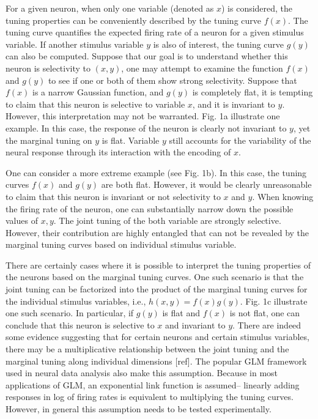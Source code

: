 \documentclass[11pt]{article}
\begin{document}
For a given neuron, when only one variable (denoted as $x$) is considered, the tuning properties can be conveniently described by the tuning curve $f(x)$. The tuning curve quantifies the expected firing rate of a neuron for a given stimulus variable.
If another stimulus variable $y$ is also of interest, the tuning curve $g(y)$ can also be computed. Suppose that our goal is to understand whether this neuron is selectivity to $(x,y)$, one may attempt to examine the function $f(x)$ and $g(y)$ to see if one or both of them show strong selectivity. Suppose that $f(x)$ is a narrow Gaussian function, and $g(y)$ is completely flat, it is tempting to claim that this neuron is selective to variable $x$, and it is invariant to $y$. However, this interpretation may not be warranted. Fig. 1a illustrate one example. In this case, the response of the neuron is clearly not invariant to $y$, yet the marginal tuning on $y$ is flat. Variable $y$ still accounts for the variability of the neural response through its interaction with the encoding of $x$.

One can consider a more extreme example (see Fig. 1b). In this case, the tuning curves $f(x)$ and $g(y)$ are both flat. However, it would be clearly unreasonable to claim that this neuron is invariant or not selectivity to $x$ and $y$. When knowing the firing rate of the neuron, one can substantially narrow down the possible  values of $x, y$. The joint tuning of the both variable are strongly selective. However, their contribution are highly entangled that can not be revealed by the marginal tuning curves based on individual stimulus variable. 

There are certainly cases where it is possible to interpret the tuning properties of the neurons based on the marginal tuning curves. One such scenario is that the joint tuning can be factorized into the product of the marginal tuning curves for the individual stimulus variables, i.e., $h(x,y)=f(x)g(y)$. Fig. 1c illustrate one such scenario. In particular, if $g(y)$ is flat and $f(x)$ is not flat, one can conclude that this neuron is selective to $x$ and invariant to $y$.
There are indeed some evidence suggesting that for certain neurons and certain stimulus variables, there may be a multiplicative relationship between the joint tuning and the marginal tuning along individual dimensions [ref]. The popular GLM framework used in neural data analysis also make this assumption. Because in most applications of GLM, an exponential link function is assumed-- linearly adding responses in log of firing rates is equivalent to multiplying the tuning curves. 
However, in general this assumption needs to be tested experimentally. 
\end{document}

